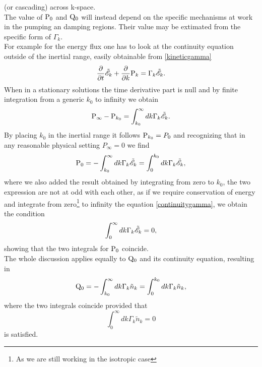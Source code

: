 (or cascading) across k-space.\\
The value of $\mathrm{P}_0$ and $\mathrm{Q}_0$ will instead depend on the specific mechanisms at work in the pumping an damping regions. Their value may be extimated 
from the specific form of $\Gamma_k$. \\
For example for the energy flux one has to look at the continuity equation outside of the inertial range, easily obtainable from \eqref{kineticgamma} 
\begin{equation}
    \frac{\partial}{\partial t} \tilde{\mathscr{E}}_k + \frac{\partial}{\partial k}  \mathrm{P}_k = \Gamma_k \tilde{\mathscr{E}}_k. 
    \label{continuitygamma}
\end{equation}
When in a stationary solutions the time derivative part is null and by finite integration from a generic $k_0$ to infinity we obtain
\begin{equation}
\mathrm{P}_{\infty} - \mathrm{P}_{k_0} = \int_{k_0}^{\infty} dk \Gamma_k \tilde{\mathscr{E}}_k.
\end{equation}
By placing $k_0$ in the inertial range it follows $\mathrm{P}_{k_0} = P_0$ and recognizing that in any reasonable physical setting $P_{\infty} = 0$ we find
\begin{equation}
    \mathrm{P}_0 = - \int_{k_0}^{\infty} dk \Gamma_k \tilde{\mathscr{E}}_k = \int_{0}^{k_0} dk \Gamma_k \tilde{\mathscr{E}}_k,
\end{equation}
where we also added the result obtained by integrating from zero to $k_0$, the two expression are not at odd with each other, as if we require conservation of energy 
and integrate from zero\footnote{As we are still working in the isotropic case} to infinity the equation \eqref{continuitygamma}, we obtain the condition 
\begin{equation}
    \int_{0}^{\infty} dk \Gamma_k\tilde{\mathscr{E}}_k = 0, 
\end{equation}
showing that the two integrals for $\mathrm{P}_0$ coincide. \\
The whole discussion applies equally to $\mathrm{Q}_0$ and its continuity equation, resulting in 
\begin{equation}
    \mathrm{Q}_0 = - \int_{k_0}^{\infty} dk \Gamma_k \tilde{n}_k = \int_{0}^{k_0} dk \Gamma_k \tilde{n}_k,
\end{equation}
where the two integrals coincide provided that 
\begin{equation}
    \int_{0}^{\infty} dk \Gamma_k\tilde{n}_k = 0
\end{equation}
is satisfied. \\

